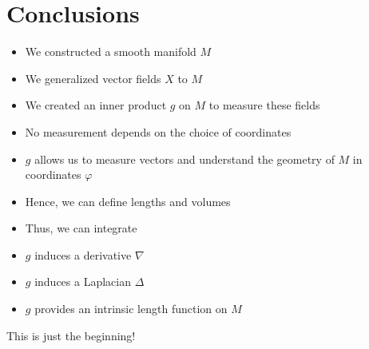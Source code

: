 \documentclass[UKenglish]{beamer}
\begin{document}
\section{Conclusions}

\begin{frame}{}
	\vfill
	\begin{itemize}
		\item We constructed a smooth manifold $M$
		\pause
		\item We generalized vector fields $X$ to $M$
		\pause
		\item We created an inner product $g$ on $M$ to measure these fields
		\pause
		\item No measurement depends on the choice of coordinates
	\end{itemize}
	\vfill
\end{frame}

\begin{frame}{}
	\vfill
	\begin{itemize}
		\item $g$ allows us to measure vectors and understand the geometry of $M$ in coordinates $\varphi$
		\pause
		\item Hence, we can define lengths and volumes
		\pause
		\item Thus, we can integrate
	\end{itemize}
	\vfill
\end{frame}

\begin{frame}{}
	\vfill
	\begin{itemize}
		\item $g$ induces a derivative $\nabla$
		\pause
		\item $g$ induces a Laplacian $\Delta$
		\pause
		\item $g$ provides an intrinsic length function on $M$
	\end{itemize}
	\vfill
\end{frame}

\begin{frame}{}
	\vfill
	This is just the beginning!
	\vfill
\end{frame}
\end{document}
